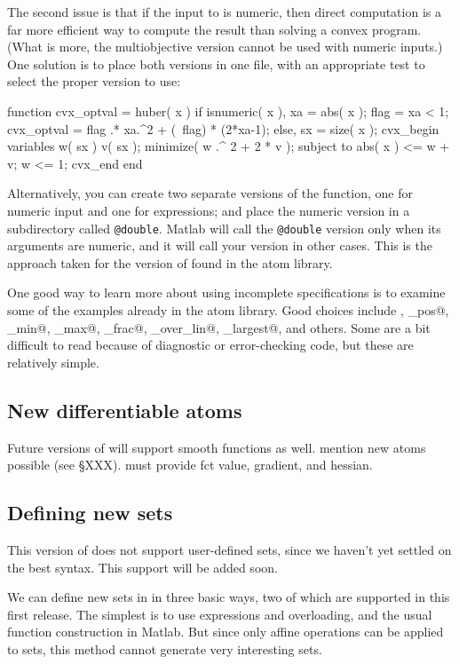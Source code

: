 \documentclass[12pt]{article}
\begin{document}
The second issue is that if the input to \verb@huber@ is numeric, then
direct computation is a far more efficient way to compute the result
than solving a convex program. (What is more, the multiobjective version
cannot be used with numeric inputs.) One solution is to place 
both versions in one file, with an appropriate test to select
the proper version to use:
\begin{code}
	function cvx_optval = huber( x )
	if isnumeric( x ),
	    xa   = abs( x );
	    flag = xa < 1;
	    cvx_optval = flag .* xa.^2 + (~flag) * (2*xa-1);
	else,
	    sx = size( x );
	    cvx_begin
	        variables w( sx ) v( sx );
	        minimize( w .^ 2 + 2 * v );
	        subject to
	            abs( x ) <= w + v;
	            w <= 1;
	    cvx_end
	end
\end{code}
Alternatively, you can create two separate versions of the function, one 
for numeric input and one for \cvx expressions; and 
place the numeric version in a subdirectory called
\verb+@double+. Matlab will call the \verb+@double+ version only when its
arguments are numeric, and it will call your \cvx version in other cases.
This is the approach taken for the version of \verb@huber@ found in the \cvx
atom library.

One good way to learn more about using incomplete specifications is to
examine some of the examples already in the \cvx atom library. 
Good choices include \verb@huber@, \verb@inv_pos@, \verb@lambda_min@,
\verb@lambda_max@, \verb@matrix_frac@, \verb@quad_over_lin@,
\verb@sum_largest@, and others. Some are
a bit difficult to read because of diagnostic or error-checking code,
but these are relatively simple.

\iffalse
\subsection{New differentiable atoms}
Future versions of \cvx will support smooth functions as well.
mention new atoms possible (see \S XXX). must provide fct value,
gradient, and hessian.

\subsection{Defining new sets}
This version of \cvx does not support user-defined sets,
since we haven't yet settled on the best syntax.
This support will be added soon.

We can define new sets in \cvx in three basic ways, two of which
are supported in this first release.
The simplest is to use expressions and overloading, and the usual
function construction in Matlab.  But since only affine operations
can be applied to sets, this method cannot generate very 
interesting sets. 
\end{document}
